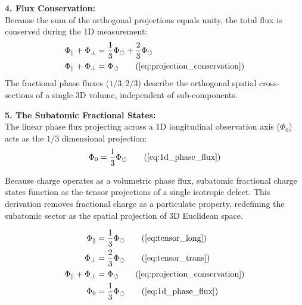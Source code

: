 \vspace{0.2 cm}

\textbf{4. Flux Conservation:} \\
Because the sum of the orthogonal projections equals unity, the total flux is conserved during the 1D measurement: 
\begin{align}
    \Phi_{\parallel} + \Phi_{\perp} &= \frac{1}{3}\Phi_{\circlearrowleft} + \frac{2}{3}\Phi_{\circlearrowleft} \nonumber \\
    \Phi_{\parallel} + \Phi_{\perp} &= \Phi_{\circlearrowleft} \tag{\ref{eq:projection_conservation}}
\end{align}
The fractional phase fluxes ($1/3, 2/3$) describe the orthogonal spatial cross-sections of a single 3D volume, independent of sub-components. 

\vspace{0.2 cm}

\textbf{5. The Subatomic Fractional States:} \\
The linear phase flux projecting across a 1D longitudinal observation axis ($\Phi_0$) acts as the $1/3$ dimensional projection: 
\begin{equation}
    \Phi_0 = \frac{1}{3} \Phi_{\circlearrowleft} \tag{\ref{eq:1d_phase_flux}}
\end{equation}

Because charge operates as a volumetric phase flux, subatomic fractional charge states function as the tensor projections of a single isotropic defect. This derivation removes fractional charge as a particulate property, redefining the subatomic sector as the spatial projection of 3D Euclidean space. 

\begin{tcolorbox}[recallbox, title={\ref{box:tensor_projections}. 1D Fractional Phase Flux (Dimensional Projections)}]
\begin{align}
    \Phi_{\parallel} &= \frac{1}{3} \Phi_{\circlearrowleft} \tag{\ref{eq:tensor_long}} \\
    \Phi_{\perp} &= \frac{2}{3} \Phi_{\circlearrowleft} \tag{\ref{eq:tensor_trans}} \\
    \Phi_{\parallel} + \Phi_{\perp} &= \Phi_{\circlearrowleft} \tag{\ref{eq:projection_conservation}} \\
    \Phi_0 &= \frac{1}{3} \Phi_{\circlearrowleft} \tag{\ref{eq:1d_phase_flux}}
\end{align}
\end{tcolorbox}

